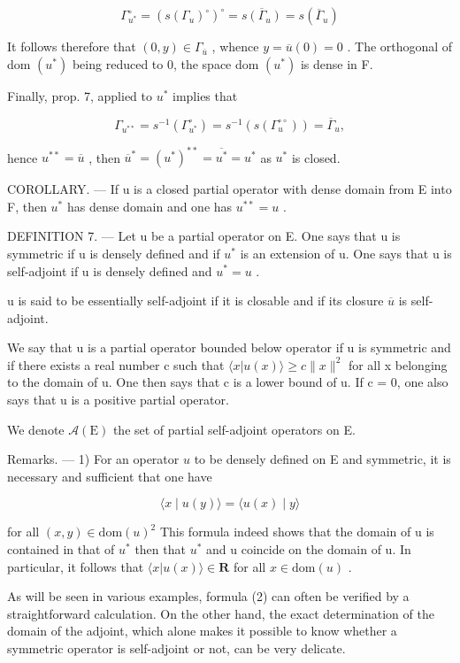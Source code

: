 \[
\Gamma_ {u ^ {*}} ^ {\circ} = (s (\Gamma_ {u}) ^ {\circ}) ^ {\circ} = \overline {{s (\Gamma_ {u})}} = s (\overline {{\Gamma}} _ {u})
\]

It follows therefore that \((0,y)\in\Gamma_{\overline{u}}\) , whence \(y=\overline{u}(0)=0\) . The orthogonal of dom \((u^{*})\) being reduced to 0, the space dom \((u^{*})\) is dense in F.

Finally, prop. 7, applied to \(u^{*}\) implies that

\[
\Gamma_ {u ^ {* *}} = s ^ {- 1} (\Gamma_ {u ^ {*}} ^ {\circ}) = s ^ {- 1} (s (\Gamma_ {u} ^ {\circ \circ})) = \overline {{\Gamma}} _ {u},
\]

hence \(u^{**} = \overline{u}\) , then \(\overline{u}^{*} = (u^{*})^{**} = \overline{u^{*}} = u^{*}\) as \(u^{*}\) is closed.

COROLLARY. --- If u is a closed partial operator with dense domain from E into F, then \(u^{*}\) has dense domain and one has \(u^{**} = u\) .

DEFINITION 7. --- Let u be a partial operator on E. One says that u is symmetric if u is densely defined and if \(u^{*}\) is an extension of u. One says that u is self-adjoint if u is densely defined and \(u^{*} = u\) .

u is said to be essentially self-adjoint if it is closable and if its closure \(\overline{u}\) is self-adjoint.

We say that u is a partial operator bounded below operator if u is symmetric and if there exists a real number c such that \(\langle x | u(x) \rangle \geqslant c \|x\|^{2}\) for all x belonging to the domain of u. One then says that c is a lower bound of u. If c = 0, one also says that u is a positive partial operator.

We denote \(\mathcal{A}(\mathrm{E})\) the set of partial self-adjoint operators on E.

Remarks. --- 1) For an operator \(u\) to be densely defined on E and symmetric, it is necessary and sufficient that one have

\[
\langle x \mid u (y) \rangle = \langle u (x) \mid y \rangle\tag{2}
\]

for all \((x,y)\in\mathrm{dom}(u)^{2}\) This formula indeed shows that the domain of u is contained in that of \(u^{*}\) then that \(u^{*}\) and u coincide on the domain of u. In particular, it follows that \(\langle x|u(x)\rangle\in\mathbf{R}\) for all \(x\in\mathrm{dom}(u)\) .

As will be seen in various examples, formula (2) can often be verified by a straightforward calculation. On the other hand, the exact determination of the domain of the adjoint, which alone makes it possible to know whether a symmetric operator is self-adjoint or not, can be very delicate.

